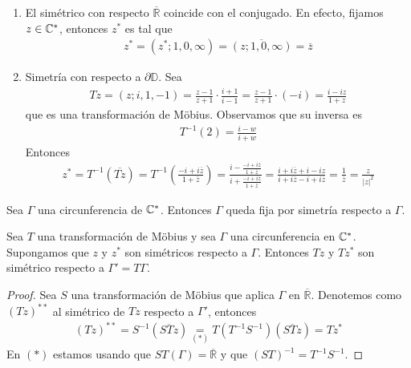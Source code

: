 \begin{ejemplo}
    \begin{enumerate}
        \item El simétrico con respecto $\overline{\mathbb{R}}$ coincide con el conjugado. En efecto, fijamos $z \in \mathbb{C}^*$, entonces $z^*$ es tal que
              \begin{align*}
                  z^* = (z^*;1,0,\infty) = \overline{(z;1,0,\infty)} = \overline{z}
              \end{align*}
        \item Simetría con respecto a $\partial \mathbb{D}$. Sea
              \begin{align*}
                  Tz = (z;i,1,-1) = \frac{z-1}{z+1} \cdot \frac{i+1}{i-1} = \frac{z-1}{z+1} \cdot (-i) = \frac{i - iz}{1 + z}
              \end{align*}
              que es una transformación de M\"obius. Observamos que su inversa es
              \begin{align*}
                  T^{-1}(2) = \frac{i- w}{i + w}
              \end{align*}
              Entonces
              \begin{align*}
                  z^* = T^{-1}(\overline{Tz}) = T^{-1}\left( \frac{-i + i\overline{z}}{1 + \overline{z}} \right) = \frac{i - \frac{-i + i\overline{z}}{1 + \overline{z}}}{i + \frac{-i + i\overline{z}}{1 + \overline{z}}} = \frac{i + i\overline{z} + i - iz}{i + i\overline{z} -i + i\overline{z}} = \frac{1}{\overline{z}} = \frac{z}{|z|^2}
              \end{align*}
    \end{enumerate}
\end{ejemplo}

\begin{prop}
    Sea $\Gamma$ una circunferencia de $\mathbb{C}^*$. Entonces $\Gamma$ queda fija por simetría respecto a $\Gamma$.
\end{prop}

\begin{teo}
    Sea $T$ una transformación de M\"obius y sea $\Gamma$ una circunferencia en $\mathbb{C}^*$. Supongamos que $z$ y $z^*$ son simétricos respecto a $\Gamma$. Entonces $Tz$ y $Tz^*$ son simétrico respecto a $\Gamma' = T\Gamma$.
\end{teo}

\begin{proof}
    Sea $S$ una transformación de M\"obius que aplica $\Gamma$ en $\overline{\mathbb{R}}$. Denotemos como $(Tz)^{**}$ al simétrico de $Tz$ respecto a $\Gamma'$, entonces
    \begin{align*}
        (Tz)^{**} = S^{-1}(\overline{STz}) \underset{(*)}{=} T(T^{-1}S^{-1})(\overline{STz}) = Tz^*
    \end{align*}
    En $(*)$ estamos usando que $ST(\Gamma) = \overline{\mathbb{R}}$ y que $(ST)^{-1} = T^{-1}S^{-1}$.
\end{proof}

